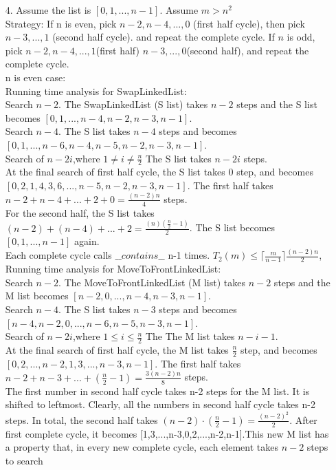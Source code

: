 \documentclass[fontsize=11pt]{article}
\begin{document}
\begin{enumerate}
\item[4.]
Assume the list is $[0,1,...,n-1]$. Assume $m>n^2$
\\Strategy: If n is even, pick $n-2, n-4,..., 0$ (first half cycle), then pick $n-3, ...,1$ (second half cycle). and repeat the complete cycle. If $n$ is odd, pick $n-2, n-4, ...,1$(first half) $n-3,...,0$(second half), and repeat the complete cycle.
\\n is even case:
\\Running time analysis for SwapLinkedList:
\\Search $n-2$. The SwapLinkedList (S list) takes $n-2$ steps and the S list becomes $[0,1,...,n-4,n-2,n-3,n-1]$.
\\Search $n-4$. The S list takes $n-4$ steps and becomes $[0,1,...,n-6,n-4,n-5,n-2,n-3,n-1]$.
\\Search of $n-2i$,where $1\neq i \neq \frac{n}{2}$ The S list takes $n-2i$ steps.
\\At the final search of first half cycle, the S list takes 0 step, and becomes $[0,2,1,4,3,6,...,n-5,n-2,n-3,n-1]$. The first half takes $n-2+n-4+...+2+0=\frac{(n-2)n}{4}$ steps.
\\For the second half, the S list takes $(n-2)+(n-4)+...+2=\frac{(n)(\frac{n}{2}-1)}{2}$. The S list becomes $[0,1,...,n-1]$ again.
\\ Each complete cycle calls $\_\_contains\_\_$ n-1 times. $T_2(m)\leq \lceil\frac{m}{n-1}\rceil\frac{(n-2)n}{2}$,
\\Running time analysis for MoveToFrontLinkedList:
\\Search $n-2$. The MoveToFrontLinkedList (M list) takes $n-2$ steps and the M list becomes $[n-2,0,...,n-4,n-3,n-1]$.
\\Search $n-4$. The S list takes $n-3$ steps and becomes $[n-4, n-2,0,...,n-6, n-5,n-3,n-1]$.
\\Search of $n-2i$,where $1\leq i \leq \frac{n}{2}$ The The M list takes $n-i-1$.
\\At the final search of first half cycle, the M list takes $\frac{n}{2}$ step, and becomes $[0,2,...,n-2,1,3,...,n-3,n-1]$. The first half takes $n-2+n-3+...+(\frac{n}{2}-1)=\frac{3(n-2)n}{8}$ steps.
\\The first number in second half cycle takes n-2 steps for the M list. It is shifted to leftmost. Clearly, all the numbers in second half cycle takes n-2 steps. In total, the second half takes $(n-2)\cdot (\frac{n}{2}-1)=\frac{(n-2)^2}{2}$. After first complete cycle, it becomes [1,3,...,n-3,0,2,...,n-2,n-1].This new M list has a property that, in every new complete cycle, each element takes $n-2$ steps to search

\end{enumerate}
\end{document}
